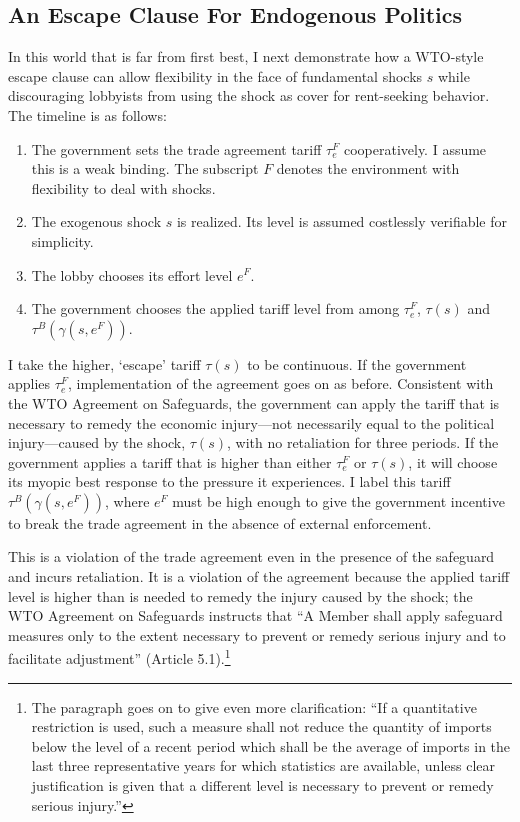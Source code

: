 \documentclass[12pt,titlepage]{article}
\newcommand{\ga}{\gamma}
\begin{document}
\subsection{An Escape Clause For Endogenous Politics}
\label{sec:ECendog}
In this world that is far from first best, I next demonstrate how a WTO-style escape clause can allow flexibility in the face of fundamental shocks $s$ while discouraging lobbyists from using the shock as cover for rent-seeking behavior. The timeline is as follows:
\begin{enumerate}
	\item The government sets the trade agreement tariff $\tau_e^F$ cooperatively. I assume this is a weak binding. The subscript $F$ denotes the environment with flexibility to deal with shocks.
	\item The exogenous shock $s$ is realized. Its level is assumed costlessly verifiable for simplicity.
	\item The lobby chooses its effort level $e^F$.
	\item The government chooses the applied tariff level from among $\tau_e^F$, $\tau(s)$ and $\tau^B(\ga(s,e^F))$.
\end{enumerate}
I take the higher, `escape' tariff $\tau(s)$ to be continuous. If the government applies $\tau_e^F$, implementation of the agreement goes on as before. Consistent with the WTO Agreement on Safeguards, the government can apply the tariff that is necessary to remedy the economic injury---not necessarily equal to the political injury---caused by the shock, $\tau(s)$, with no retaliation for three periods. If the government applies a tariff that is higher than either $\tau_e^F$ or $\tau(s)$, it will choose its myopic best response to the pressure it experiences. I label this tariff $\tau^B(\ga(s,e^F))$, where $e^F$ must be high enough to give the government incentive to break the trade agreement in the absence of external enforcement.

This is a violation of the trade agreement even in the presence of the safeguard and incurs retaliation. It is a violation of the agreement because the applied tariff level is higher than is needed to remedy the injury caused by the shock; the WTO Agreement on Safeguards instructs that ``A Member shall apply safeguard measures only to the extent necessary to prevent or remedy serious injury and to facilitate adjustment'' (Article 5.1).\footnote{The paragraph goes on to give even more clarification: ``If a quantitative restriction is used, such a measure shall  not reduce the quantity of imports below the level of a recent period which shall be the average of imports in the last three representative years for which statistics are available, unless clear justification is given that a different level is necessary to prevent or remedy serious injury.''}
\end{document}

